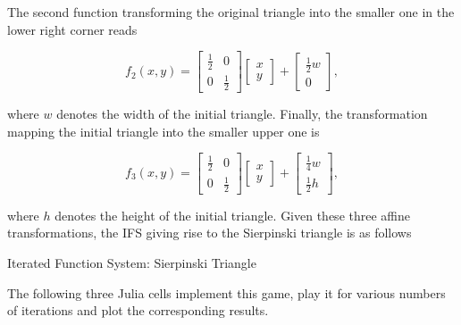 \documentclass[11pt]{article}
\begin{document}
The second function transforming the original triangle into the smaller
one in the lower right corner reads

\[
    f_2(x, y) =  \begin{bmatrix} \frac{1}{2} & 0 \\ 0 & \frac{1}{2} \end{bmatrix} \begin{bmatrix} x \\ y \end{bmatrix} + \begin{bmatrix} \frac{1}{2}w \\ 0 \end{bmatrix},
\]

where \(w\) denotes the width of the initial triangle. Finally, the
transformation mapping the initial triangle into the smaller upper one
is

\[
    f_3(x, y) =  \begin{bmatrix} \frac{1}{2} & 0 \\ 0 & \frac{1}{2} \end{bmatrix} \begin{bmatrix} x \\ y \end{bmatrix} + \begin{bmatrix} \frac{1}{4}w \\ \frac{1}{2}h \end{bmatrix},
\]

where \(h\) denotes the height of the initial triangle. Given these
three affine transformations, the IFS giving rise to the Sierpinski
triangle is as follows

Iterated Function System: Sierpinski Triangle

The following three Julia cells implement this game, play it for various
numbers of iterations and plot the corresponding results.
\end{document}
